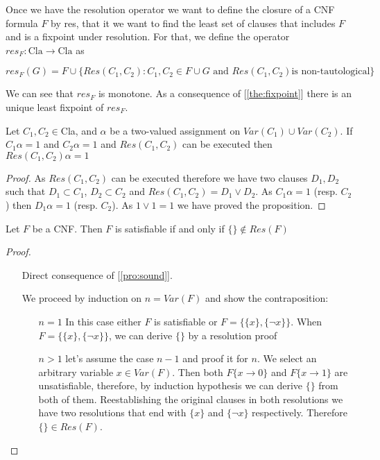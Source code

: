 Once we have  the resolution operator we want to define the closure of a CNF formula $F$ by res, that it we want to find the least set of clauses that includes $F$ and is a fixpoint under resolution. For that, we define the operator $res_F:\text{Cla}\to\text{Cla}$ as

$$res_F(G) = F \cup \{Res(C_1,C_2) : C_1,C_2 \in F \cup G \text{ and } Res(C_1,C_2) \text{is non-tautological}\}$$


We can see that $res_F$ is monotone. As a consequence of [\ref{the:fixpoint}] there is an unique least fixpoint of $res_F$.

\begin{proposition} \label{pro:sound}
  Let $C_1, C_2 \in $Cla, and $\alpha$ be a two-valued assignment on $Var(C_1)\cup Var(C_2)$. If $C_1 \alpha = 1$ and $C_2 \alpha = 1$ and $Res(C_1,C_2)$ can be executed then $Res(C_1,C_2) \alpha = 1$
\end{proposition}
\begin{proof}
As $Res(C_1,C_2)$ can be executed therefore we have two clauses $D_1,D_2$ such that $D_1 \subset C_1$, $D_2 \subset C_2$ and $Res(C_1,C_2) = D_1\vee D_2$. As $C_1\alpha = 1$ (resp. $C_2$) then $D_1\alpha = 1$ (resp. $C_2$). As $1 \vee 1=1$ we have proved the proposition.
\end{proof}


\begin{theorem}
Let $F$ be a CNF. Then $F$ is satisfiable if and only if $\{\} \not\in Res(F)$
\end{theorem}
\begin{proof}\hfill
  \begin{itemize}\item[\fbox{$\Rightarrow$}] Direct consequence of [\ref{pro:sound}].
  \item[\fbox{$\Leftarrow$}] We proceed by induction on $n = Var(F)$ and show the contraposition:
    \begin{itemize}
    \item[$n=1$] In this case either $F$ is satisfiable or $F = \{\{x\},\{\neg x\}\}$.  When $F = \{\{x\},\{\neg x\}\}$, we can derive $\{\}$ by a resolution proof
      
    \item[$n>1$] let's assume the case $n-1$ and proof it for $n$. We select an arbitrary variable $x\in Var(F)$. Then both $F\{x\to 0\}$ and  $F\{x\to 1\}$ are unsatisfiable, therefore, by induction hypothesis we can derive $\{\}$ from both of them. Reestablishing the original clauses in both resolutions we have two resolutions that end with $\{x\}$ and $\{\neg x\}$ respectively. Therefore $\{\} \in Res(F)$.
    \end{itemize}
  \end{itemize}
\end{proof}

